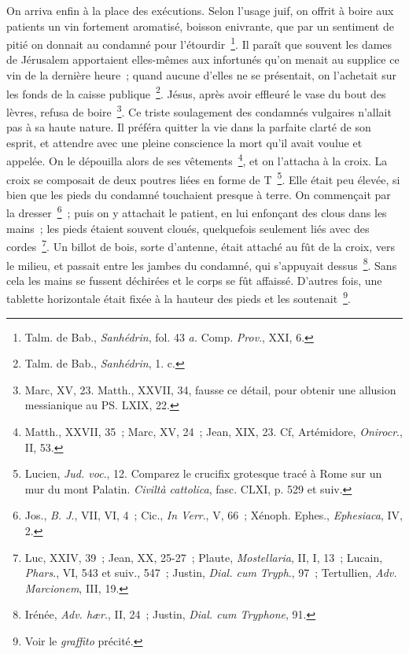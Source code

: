 \documentclass[french,twoside]{book} %
\begin{document}
On arriva enfin à la place des exécutions. Selon l’usage juif, on offrit à boire aux patients un vin fortement aromatisé, boisson enivrante, que par un sentiment de pitié on donnait au condamné pour l’étourdir \footnote{ Talm. de Bab., {\itshape Sanhédrin}, fol. 43 {\itshape a.} Comp. {\itshape Prov}., XXI, 6.}. Il paraît que souvent les dames de Jérusalem apportaient elles-mêmes aux infortunés qu’on menait au supplice ce vin de la dernière heure ; quand aucune d’elles ne se présentait, on l’achetait sur les fonds de la caisse publique \footnote{ Talm. de Bab., {\itshape Sanhédrin}, 1. c.}. Jésus, après avoir effleuré le vase du bout des lèvres, refusa de boire \footnote{Marc, XV, 23. Matth., XXVII, 34, fausse ce détail, pour obtenir une allusion messianique au PS. LXIX, 22.}. Ce triste soulagement des condamnés vulgaires n’allait pas à sa haute nature. Il préféra quitter la vie dans la parfaite clarté de son esprit, et attendre avec une pleine conscience la mort qu’il avait voulue et appelée. On le dépouilla alors de ses vêtements \footnote{ Matth., XXVII, 35 ; Marc, XV, 24 ; Jean, XIX, 23. Cf, Artémidore, {\itshape Onirocr}., II, 53.}, et on l’attacha à la croix. La croix se composait de deux poutres liées en forme de T \footnote{ Lucien, {\itshape Jud. voc}., 12. Comparez le crucifix grotesque tracé à Rome sur un mur du mont Palatin. {\itshape Civiltà cattolica}, fasc. CLXI, p. 529 et suiv.}. Elle était peu élevée, si bien que les pieds du condamné touchaient presque à terre. On commençait par la dresser \footnote{ Jos., {\itshape B. J}., VII, VI, 4 ; Cic., {\itshape In Verr}., V, 66 ; Xénoph. Ephes., {\itshape Ephesiaca}, IV, 2.} ; puis on y attachait le patient, en lui enfonçant des clous dans les mains ; les pieds étaient souvent cloués, quelquefois seulement liés avec des cordes \footnote{ Luc, XXIV, 39 ; Jean, XX, 25-27 ; Plaute, {\itshape Mostellaria}, II, I, 13 ; Lucain, {\itshape Phars}., VI, 543 et suiv., 547 ; Justin, {\itshape Dial. cum Tryph}., 97 ; Tertullien, {\itshape Adv. Marcionem}, III, 19.}. Un billot de bois, sorte d’antenne, était attaché au fût de la croix, vers le milieu, et passait entre les jambes du condamné, qui s’appuyait dessus \footnote{ Irénée, {\itshape Adv. hær}., II, 24 ; Justin, {\itshape Dial. cum Tryphone}, 91.}. Sans cela les mains se fussent déchirées et le corps se fût affaissé. D’autres fois, une tablette horizontale était fixée à la hauteur des pieds et les soutenait \footnote{ Voir le {\itshape graffito} précité.}.\par
\end{document}
